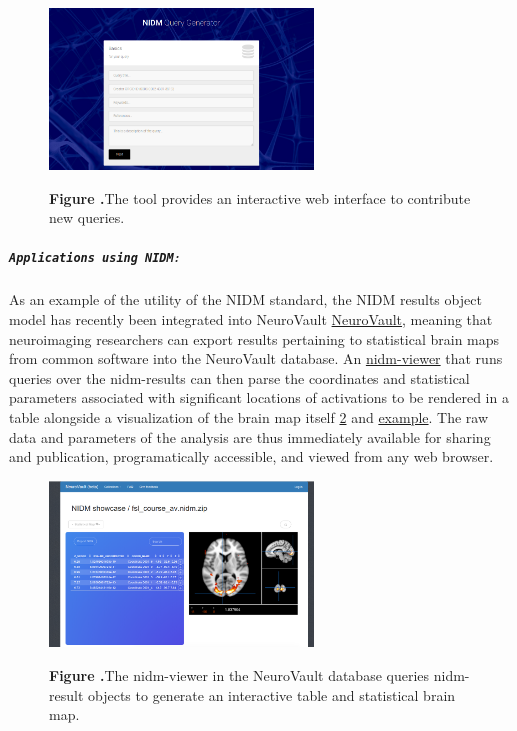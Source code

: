 \documentclass[twocolumn]{bmcart}%
\begin{document}
\begin{figure}[h!]
\begin{center}
\includegraphics[width=7cm]{img/figure2}
\end{center}
 \textbf{\label{fig:02}Figure .}{The tool provides an interactive web interface to contribute new queries.}
\end{figure}

\subparagraph{\texorpdfstring{\texttt{Applications using NIDM}:}{:}}\label{section}
As an example of the utility of the NIDM standard, the NIDM results object model \cite{noauthor_undated-if} has recently been integrated into NeuroVault \href{http://www.neurovault.org}{NeuroVault}, meaning that neuroimaging researchers can export results pertaining to statistical brain maps from common software \cite{Jenkinson2012-pr} into the NeuroVault database. An \href{https://github.com/vsoch/nidmviewer}{nidm-viewer} that runs queries over the nidm-results can then parse the coordinates and statistical parameters associated with significant locations of activations to be rendered in a table alongside a visualization of the brain map itself \ref{fig:03} and \href{http://neurovault.org/collections/877/fsl_course_av.nidm}{example}. The raw data and parameters of the analysis are thus immediately available for sharing and publication, programatically accessible, and viewed from any web browser. 

\begin{figure}[h!]
\begin{center}
\includegraphics[width=7cm]{img/figure3}
\end{center}
 \textbf{\label{fig:03}Figure .}{The nidm-viewer in the NeuroVault database queries nidm-result objects to generate an interactive table and statistical brain map.}
\end{figure}
\end{document}
